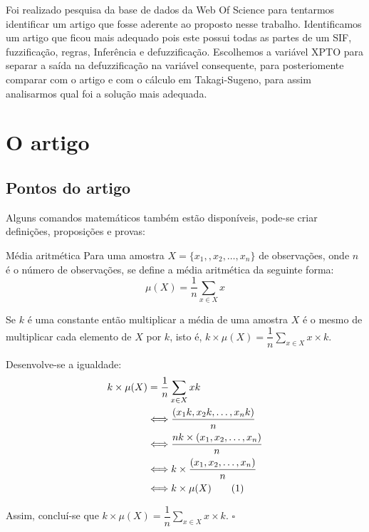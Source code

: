 \documentclass[courier]{uninove-ppgi}
\newcommand{\numberequation}[1]{\addtocounter{equation}{#1}\tag{\theequation}}
\begin{document}
\begin{resumocapitulo}
Foi realizado pesquisa da base de dados da Web Of Science para tentarmos identificar um artigo que fosse aderente ao proposto nesse trabalho.
Identificamos um artigo que ficou mais adequado pois este possui todas as partes de um SIF, fuzzificação, regras, Inferência e defuzzificação.
Escolhemos a variável XPTO para separar a saída na defuzzificação na variável consequente, para posteriomente comparar com o artigo e com o cálculo
em Takagi-Sugeno, para assim analisarmos qual foi a solução mais adequada.
\end{resumocapitulo}

\section{O artigo}

\subsection{Pontos do artigo}

Alguns comandos matemáticos também estão disponíveis, pode-se criar definições, proposições e provas:

\begin{definicao}{Média aritmética}
Para uma amostra $ X=\{x_1,, x_2, \ldots,x_n\} $ de observações, onde $ n $ é o número de observações, se define a média aritmética da seguinte forma:
\begin{equation}
\mu(X)=\dfrac{1}{n}\sum\limits_{x \in X}x
\end{equation}
\end{definicao}
\begin{proposicao}
Se $ k $ é uma constante então multiplicar a média de uma amostra $ X $ é o mesmo de multiplicar cada elemento de $ X $ por $ k $, isto é, $ k \times \mu(X) = \dfrac{1}{n} \sum\limits_{x \in X}x\times k $.
\end{proposicao}
\begin{prova}
Desenvolve-se a igualdade:
\begin{align*}
k \times \mu(X) &= \dfrac{1}{n} \sum\limits_{x \in X}xk \\
& \Longleftrightarrow  \dfrac{(x_1k,x_2k, \ldots, x_nk)}{n} \\
& \Longleftrightarrow  \dfrac{nk \times (x_1,x_2, \ldots, x_n)}{n} \\
& \Longleftrightarrow   k \times \dfrac{(x_1,x_2, \ldots, x_n)}{n} \\
& \Longleftrightarrow   k \times \mu(X) \numberequation{1}
\end{align*}
\end{prova}
Assim, concluí-se que $ k \times \mu(X) = \dfrac{1}{n} \sum\limits_{x \in X}x\times k $. $ \square $
 
\end{document}
